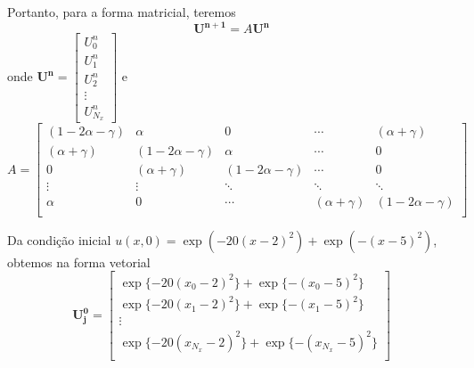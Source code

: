 \documentclass[12pt, a4paper]{article}
\renewcommand{\bf}[1]{\mathbf{#1}}
\begin{document}
    Portanto, para a forma matricial, teremos
    \begin{equation}
        \bf{U^{n+1}} = A\bf{U^n}
    \end{equation}
    onde $\bf{U^n} = \begin{bmatrix}
        U_0^n \\ U_1^n \\ U_2^n \\ \vdots \\ U_{N_x}^n
    \end{bmatrix}$ e $A = \begin{bmatrix}
        (1-2\alpha-\gamma) & \alpha & 0 & \cdots & (\alpha+\gamma)\\
        (\alpha+\gamma) & (1-2\alpha-\gamma) & \alpha & \cdots & 0\\
        0 & (\alpha+\gamma) & (1-2\alpha-\gamma) & \cdots & 0\\
        \vdots & \vdots & \ddots & \ddots & \ddots\\
        \alpha & 0 & \cdots & (\alpha+\gamma) & (1-2\alpha-\gamma)\\
    \end{bmatrix}$

    Da condição inicial $u(x,0) = \exp(-20{(x-2)}^2)+\exp(-{(x-5)}^2)$, obtemos na forma vetorial
    \[\bf{U_j^0} = \begin{bmatrix}
        \exp\{-20{(x_0-2)}^2\}+\exp\{-{(x_0-5)}^2\}\\
        \exp\{-20{(x_1-2)}^2\}+\exp\{-{(x_1-5)}^2\}\\
        \vdots\\
        \exp\{-20{(x_{N_x}-2)}^2\}+\exp\{-{(x_{N_x}-5)}^2\}\\
    \end{bmatrix}\]
    
    \newpage
\end{document}
